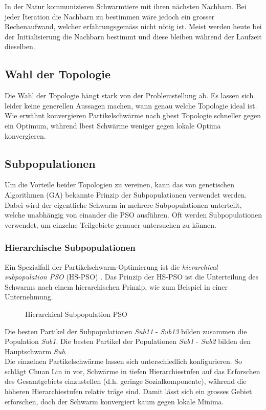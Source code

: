 In der Natur kommunizieren Schwarmtiere mit ihren nächsten Nachbarn. Bei jeder Iteration die Nachbarn zu bestimmen wäre jedoch ein grosser Rechenaufwand, welcher erfahrungsgemäss nicht nötig ist. Meist werden heute bei der Initialisierung die Nachbarn bestimmt und diese bleiben während der Laufzeit dieselben.

\subsection{Wahl der Topologie}
Die Wahl der Topologie hängt stark von der Problemstellung ab. Es lassen sich leider keine generellen Aussagen machen, wann genau welche Topologie ideal ist. Wie erwähnt konvergieren Partikelschwärme nach gbest Topologie schneller gegen ein Optimum, während lbest Schwärme weniger gegen lokale Optima konvergieren.

\subsection{Subpopulationen}
Um die Vorteile beider Topologien zu vereinen, kann das von genetischen Algorithmen (GA) bekannte Prinzip der Subpopulationen verwendet werden. Dabei wird der eigentliche Schwarm in mehrere Subpopulationen unterteilt, welche unabhängig von einander die PSO ausführen. Oft werden Subpopulationen verwendet, um einzelne Teilgebiete genauer untersuchen zu können.


\subsubsection{Hierarchische Subpopulationen}
Ein Spezialfall der Partikelschwarm-Optimierung ist die \textit{hierarchical subpopulation PSO} (HS-PSO) \cite{ChuanLin-HSPSO}. Das Prinzip der HS-PSO ist die Unterteilung des Schwarms nach einem hierarchischen Prinzip, wie zum Beispiel in einer Unternehmung.

\begin{figure}[htbp]
	\centering
	
	\caption{Hierarchical Subpopulation PSO}
	\label{hs-pso}
\end{figure}

Die besten Partikel der Subpopulationen \textit{Sub11} - \textit{Sub13} bilden zusammen die Population \textit{Sub1}. Die besten Partikel der Populationen \textit{Sub1} - \textit{Sub2} bilden den Hauptschwarm \textit{Sub}. \\

Die einzelnen Partikelschwärme lassen sich unterschiedlich konfigurieren. So schlägt Chuan Lin in \cite{ChuanLin-HSPSO} vor, Schwärme in tiefen Hierarchiestufen auf das Erforschen des Gesamtgebiets einzustellen (d.h. geringe Sozialkomponente), während die höheren Hierarchiestufen relativ träge sind. Damit lässt sich ein grosses Gebiet erforschen, doch der Schwarm konvergiert kaum gegen lokale Minima. \\

